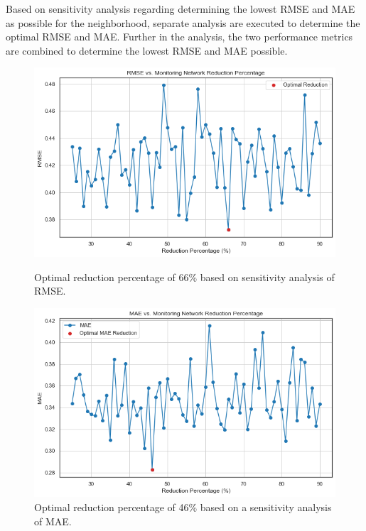 Based on sensitivity analysis regarding determining the lowest RMSE and MAE as possible for the neighborhood, separate analysis are executed to determine the optimal RMSE and MAE. Further in the analysis, the two performance metrics are combined to determine the lowest RMSE and MAE possible. 

\begin{figure}[htbp]
    \centering
    \begin{minipage}{0.48\textwidth}
        \centering
        \includegraphics[width=\linewidth]{r2roz.png}
        \caption{Optimal reduction percentage of 66\% based on sensitivity analysis of RMSE.}
        \label{fig:r2roz}
    \end{minipage}\hfill
    \begin{minipage}{0.48\textwidth}
        \centering
        \includegraphics[width=\linewidth]{maeroz.png}
        \caption{Optimal reduction percentage of 46\% based on a sensitivity analysis of MAE.}
        \label{fig:maeroz}
    \end{minipage}
\end{figure}

